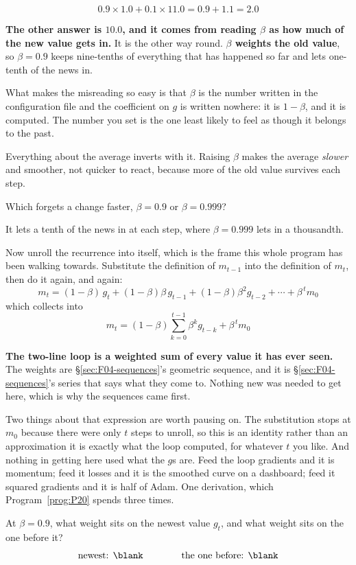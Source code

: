 \begin{fr}
\[ \num{0.9} \times \num{1.0} + \num{0.1} \times \num{11.0}
   = \num{0.9} + \num{1.1} = \num{2.0} \]

\begin{trapbox}
\textbf{The other answer is $\num{10.0}$, and it comes from reading $\beta$ as
how much of the new value gets in.} It is the other way round.
\textbf{$\beta$ weights the old value}, so $\beta = \num{0.9}$ keeps
nine-tenths of everything that has happened so far and lets one-tenth of the
news in.

What makes the misreading so easy is that $\beta$ is the number written in the
configuration file and the coefficient on $g$ is written nowhere: it is
$1 - \beta$, and it is computed. The number you set is the one least likely to
feel as though it belongs to the past.

Everything about the average inverts with it. Raising $\beta$ makes the
average \emph{slower} and smoother, not quicker to react, because more of the
old value survives each step.
\end{trapbox}

Which forgets a change faster, $\beta = \num{0.9}$ or $\beta = \num{0.999}$?
\nextframe
\end{fr}

\begin{fr}
It lets a tenth of the news in at each step, where $\beta = \num{0.999}$ lets
in a thousandth.

Now unroll the recurrence into itself, which is the frame this whole program
has been walking towards. Substitute the definition of $m_{t-1}$ into the
definition of $m_t$, then do it again, and again:
\[ m_t = (1-\beta)\,g_t + (1-\beta)\beta\,g_{t-1}
       + (1-\beta)\beta^{2} g_{t-2} + \cdots + \beta^{\,t} m_0 \]
which collects into
\[ m_t = (1-\beta)\sum_{k=0}^{t-1} \beta^{k} g_{t-k} + \beta^{\,t} m_0 \]

\textbf{The two-line loop is a weighted sum of every value it has ever seen.}
The weights are \S\ref{sec:F04-sequences}'s geometric sequence, and it is
\S\ref{sec:F04-sequences}'s series that says what they come to. Nothing new
was needed to get here, which is why the sequences came first.

Two things about that expression are worth pausing on. The substitution
stops at $m_0$ because there were only $t$ steps to unroll, so this is an
identity rather than an approximation \dash{} it is exactly what the loop
computed, for whatever $t$ you like. And nothing in getting here used what
the $g$s are. Feed the loop gradients and it is momentum; feed it losses and
it is the smoothed curve on a dashboard; feed it squared gradients and it is
half of Adam. One derivation, which Program~\ref{prog:P20} spends three
times.

At $\beta = \num{0.9}$, what weight sits on the newest value $g_t$, and what
weight sits on the one before it?
\[ \text{newest: } \blank \qquad\qquad \text{the one before: } \blank \]
\dotline
\nextframe
\end{fr}

